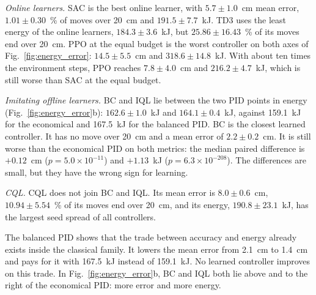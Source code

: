 \emph{Online learners.} SAC is the best online learner, with
$5.7 \pm 1.0$~cm mean error, $1.01 \pm 0.30$~\% of moves over 20~cm and
$191.5 \pm 7.7$~kJ. %
TD3 uses the least energy of the online learners, $184.3 \pm 3.6$~kJ, but
$25.86 \pm 16.43$~\% of its moves end over 20~cm. %
PPO at the equal budget is the worst controller on both axes of
Fig.~\ref{fig:energy_error}: $14.5 \pm 5.5$~cm and $318.6 \pm 14.8$~kJ. %
With about ten times the environment steps, PPO reaches $7.8 \pm 4.0$~cm and
$216.2 \pm 4.7$~kJ, which is still worse than SAC at the equal budget. %

\emph{Imitating offline learners.} BC and IQL lie between the two PID points in
energy (Fig.~\ref{fig:energy_error}b): $162.6 \pm 1.0$~kJ and
$164.1 \pm 0.4$~kJ, against 159.1~kJ for the economical and 167.5~kJ for the
balanced PID. %
BC is the closest learned controller. It has no move over 20~cm and a mean
error of $2.2 \pm 0.2$~cm. %
It is still worse than the economical PID on both metrics: the median paired
difference is $+0.12$~cm ($p = 5.0 \times 10^{-11}$) and $+1.13$~kJ
($p = 6.3 \times 10^{-208}$). %
The differences are small, but they have the wrong sign for learning.

\emph{CQL.} CQL does not join BC and IQL. Its mean error is $8.0 \pm 0.6$~cm,
$10.94 \pm 5.54$~\% of its moves end over 20~cm, and its energy,
$190.8 \pm 23.1$~kJ, has the largest seed spread of all controllers. %

The balanced PID shows that the trade between accuracy and energy already
exists inside the classical family. It lowers the mean error from 2.1~cm to
1.4~cm and pays for it with 167.5~kJ instead of 159.1~kJ. %
No learned controller improves on this trade. In
Fig.~\ref{fig:energy_error}b, BC and IQL both lie above and to the right of
the economical PID: more error and more energy. %

